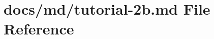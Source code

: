 \hypertarget{tutorial-2b_8md}{}\section{docs/md/tutorial-\/2b.md File Reference}
\label{tutorial-2b_8md}
